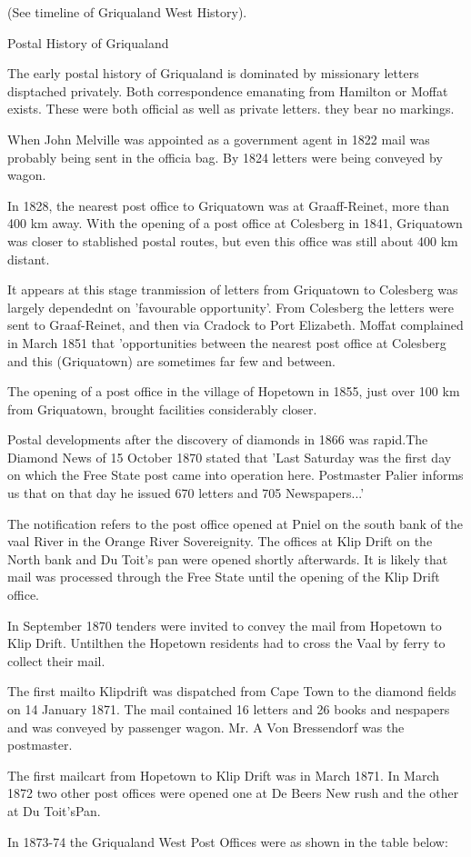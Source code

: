 (See timeline of Griqualand West History).

Postal History of Griqualand

The early postal history of Griqualand is dominated by missionary letters disptached privately. Both correspondence emanating from Hamilton or Moffat exists. These were both official as well as private letters. they bear no markings.

When John Melville was appointed as a government agent in 1822 mail was probably being sent in the officia bag. By 1824 letters were being conveyed by wagon.

In 1828, the nearest post office to Griquatown was at Graaff-Reinet, more than 400 km away. With the opening of a post office at Colesberg in 1841, Griquatown was closer to stablished postal routes, but even this office was still about 400 km distant.

It appears at this stage tranmission of letters from Griquatown to Colesberg was largely dependednt on 'favourable opportunity'. From Colesberg the letters were sent to Graaf-Reinet, and then via Cradock to Port Elizabeth. Moffat complained in March 1851 that 'opportunities between the nearest post office at Colesberg and this (Griquatown) are sometimes far few and between.

The opening of a post office in the village of Hopetown in 1855, just over 100 km from Griquatown, brought facilities considerably closer.

Postal developments after the discovery of diamonds in 1866 was rapid.The Diamond News of 15 October 1870 stated that 'Last Saturday was the first day on which the Free State post came into operation here. Postmaster Palier informs us that on that day he issued 670 letters and 705 Newspapers...'

The notification refers to the post office opened at Pniel on the south bank of the vaal River in the Orange River Sovereignity. The offices at Klip Drift on the North bank and Du Toit's pan were opened shortly afterwards. It is likely that mail was processed through the Free State until the opening of the Klip Drift office.

In September 1870 tenders were invited to convey the mail from Hopetown to Klip Drift. Untilthen the Hopetown residents had to cross the Vaal by ferry to collect their mail.

The first mailto Klipdrift was dispatched from Cape Town to the diamond fields on 14 January 1871. The mail contained 16 letters and 26 books and nespapers and was conveyed by passenger wagon. Mr. A Von Bressendorf was the postmaster.

The first mailcart from Hopetown to Klip Drift was in March 1871. In March 1872 two other post offices were opened one at De Beers New rush and the other at Du Toit'sPan.

In 1873-74 the Griqualand West Post Offices were as shown in the table below:      